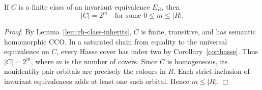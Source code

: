 \begin{corollary}
\label{cor:rh-class-2power}
If $C$ is a finite class of an invariant equivalence $E_R$, then
\[
             |C|=2^m\quad\text{for some }0\le m\le |R|.
\]
\end{corollary}
\begin{proof}
By Lemma~\ref{lem:rh-class-inherits}, $C$ is finite, transitive,
and has semantic homomorphic CCO. In a saturated chain from equality
to the universal equivalence on $C$, every Hasse cover has index two
by Corollary~\ref{cor:hasse}. Thus $|C|=2^m$, where $m$ is the number
of covers. Since $C$ is homogeneous, its nonidentity pair orbitals
are precisely the colours in $R$. Each strict inclusion of invariant
equivalences adds at least one such orbital. Hence $m\le |R|$.
\end{proof}

